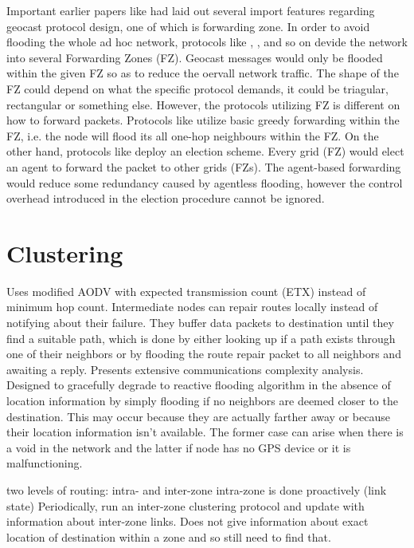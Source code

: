 \documentclass[conference]{IEEEtran}
\begin{document}
Important earlier papers like \cite{Basagni1998} had laid out several import features regarding geocast protocol design, one of which is forwarding zone. In order to avoid flooding the whole ad hoc network, protocols like \cite{Basagni1998}, \cite{Camp2003}, \cite{Liao} and so on devide the network into several Forwarding Zones (FZ). Geocast messages would 
only be flooded within the given FZ so as to reduce the oervall network traffic. The shape of the FZ could depend on what the specific protocol demands, it could be triagular, rectangular or something else. However, the protocols utilizing FZ is different on how to forward packets. Protocols like \cite{Basagni1998} utilize basic greedy forwarding within
the FZ, i.e. the node will flood its all one-hop neighbours within the FZ. On the other hand, protocols like \cite{Liao} deploy an election scheme. Every grid (FZ) would elect an agent to forward the packet to other grids (FZs). The agent-based forwarding would reduce some redundancy caused by agentless flooding, however the control overhead 
introduced in the election procedure cannot be ignored.


\section{Clustering}

\cite{Al-Rabayah2010} Uses modified AODV with expected transmission count (ETX) instead of minimum hop count.
Intermediate nodes can repair routes locally instead of notifying about their failure.
They buffer data packets to destination until they find a suitable path, which is done by either looking up if a path exists through one of their neighbors or by flooding the route repair packet to all neighbors and awaiting a reply.
Presents extensive communications complexity analysis.
Designed to gracefully degrade to reactive flooding algorithm in the absence of location information by simply flooding if no neighbors are deemed closer to the destination.
This may occur because they are actually farther away or because their location information isn't available.
The former case can arise when there is a void in the network and the latter if node has no GPS device or it is malfunctioning.

\cite{779923} two levels of routing: intra- and inter-zone
intra-zone is done proactively (link state)
Periodically, run an inter-zone clustering protocol and update with information about inter-zone links.
Does not give information about exact location of destination within a zone and so still need to find that.
\end{document}
